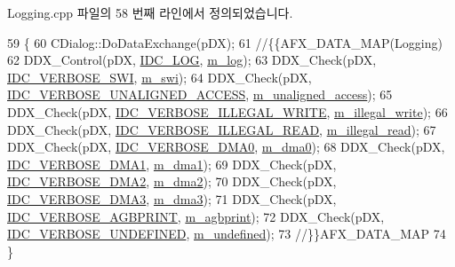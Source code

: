 Logging.\+cpp 파일의 58 번째 라인에서 정의되었습니다.


\begin{DoxyCode}
59 \{
60   CDialog::DoDataExchange(pDX);
61   \textcolor{comment}{//\{\{AFX\_DATA\_MAP(Logging)}
62   DDX\_Control(pDX, \mbox{\hyperlink{resource_8h_a7f37c0ca85aacb50491afc700513c626}{IDC\_LOG}}, \mbox{\hyperlink{class_logging_ab1fbdc0eaf2afc3f7f493a3c9605511c}{m\_log}});
63   DDX\_Check(pDX, \mbox{\hyperlink{resource_8h_adc60452b37b7eb3780a74171631ef5ac}{IDC\_VERBOSE\_SWI}}, \mbox{\hyperlink{class_logging_abd4d213306cb311e8ae4ebdeebb02855}{m\_swi}});
64   DDX\_Check(pDX, \mbox{\hyperlink{resource_8h_a95767e0fb04252f136c9a69c23cecb09}{IDC\_VERBOSE\_UNALIGNED\_ACCESS}}, 
      \mbox{\hyperlink{class_logging_a7d30e53c3d12b78d9db8627a39fa9d4e}{m\_unaligned\_access}});
65   DDX\_Check(pDX, \mbox{\hyperlink{resource_8h_a62ee17cd0579b29886a34a56691fb082}{IDC\_VERBOSE\_ILLEGAL\_WRITE}}, 
      \mbox{\hyperlink{class_logging_a423cc3cbd5f9b710e696fdfb9ef4ec4b}{m\_illegal\_write}});
66   DDX\_Check(pDX, \mbox{\hyperlink{resource_8h_a074aac5c4913d1c818ead6d43c777276}{IDC\_VERBOSE\_ILLEGAL\_READ}}, 
      \mbox{\hyperlink{class_logging_a3b4a194ce51579e42841f4773510cb7d}{m\_illegal\_read}});
67   DDX\_Check(pDX, \mbox{\hyperlink{resource_8h_a377cb77ab443d8e5f77b0338ab2ed1ea}{IDC\_VERBOSE\_DMA0}}, \mbox{\hyperlink{class_logging_ab0e3d418460cc5c8d699fd8c321463a2}{m\_dma0}});
68   DDX\_Check(pDX, \mbox{\hyperlink{resource_8h_abdc0aafdd3b7e03d1aa066bc4dda9819}{IDC\_VERBOSE\_DMA1}}, \mbox{\hyperlink{class_logging_a7c8a00ceb6cc33b59daff89a3b509ab6}{m\_dma1}});
69   DDX\_Check(pDX, \mbox{\hyperlink{resource_8h_ac775bdeb1d13240338217d49e0120bd3}{IDC\_VERBOSE\_DMA2}}, \mbox{\hyperlink{class_logging_a55074d40fb891df86bda48f59568b1e6}{m\_dma2}});
70   DDX\_Check(pDX, \mbox{\hyperlink{resource_8h_a717d421a624a77869cb658cb6807a619}{IDC\_VERBOSE\_DMA3}}, \mbox{\hyperlink{class_logging_aa540b301bc08f1302beb83ff574d89c4}{m\_dma3}});
71   DDX\_Check(pDX, \mbox{\hyperlink{resource_8h_a9cc27990f612f077c45e03e1f1d08069}{IDC\_VERBOSE\_AGBPRINT}}, \mbox{\hyperlink{class_logging_a1d79a280aa882918585c08f3e0c2b747}{m\_agbprint}});
72   DDX\_Check(pDX, \mbox{\hyperlink{resource_8h_af3308110d495aa0d7df95bad67090bf4}{IDC\_VERBOSE\_UNDEFINED}}, \mbox{\hyperlink{class_logging_a622f9b082c10c8195c5faa7a8577d520}{m\_undefined}});
73   \textcolor{comment}{//\}\}AFX\_DATA\_MAP}
74 \}
\end{DoxyCode}
\mbox{\label{class_logging_a01865a1ae55994b43fb518909bbe1552}} 
